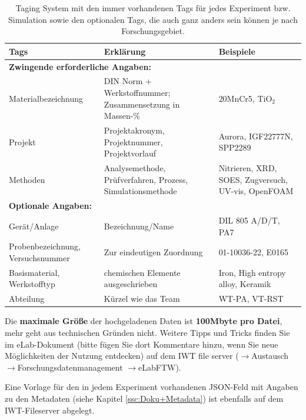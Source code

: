 \begin{table}[H]
 \centering
 \begin{tabular}{|p{5cm}|p{7cm}|p{3cm}|}
 \hline
 {\bf Tags} & {\bf Erklärung} & {\bf Beispiele} \\
 \hline
 \multicolumn{3}{|l|}{\bf Zwingende erforderliche Angaben:} \\
 \hline
 Materialbezeichnung & DIN Norm + Werkstoffnummer; Zusammensetzung in Massen-\%  & 20MnCr5, TiO$_2$ \\ \hdashline
 Projekt & Projektakronym, Projektnummer, Projektvorlauf & Aurora, IGF22777N, SPP2289 \\ \hdashline
 Methoden & Analysemethode, Prüfverfahren, Prozess, Simulationsmethode & Nitrieren, XRD, SOES, Zugversuch, UV-vis, OpenFOAM \\
 \hline
 \multicolumn{3}{|l|}{\bf Optionale Angaben:} \\
 \hline
 Gerät/Anlage & Bezeichnung/Name & DIL 805 A/D/T, PA7 \\ \hdashline
 Probenbezeichnung, Versuchsnummer & Zur eindeutigen Zuordnung & 01-10036-22, E0165 \\ \hdashline
 Basismaterial, Werkstofftyp & chemischen Elemente ausgeschrieben & Iron, High entropy alloy, Keramik \\ \hdashline
 Abteilung & Kürzel wie das Team & WT-PA, VT-RST \\
 \hline
 \end{tabular}
 \caption{Taging System mit den immer vorhandenen Tags für jedes Experiment bzw. Simulation sowie den optionalen Tags, die auch ganz anders sein können je nach Forschungsgebiet.}
\label{table:tagging-system}
\end{table}





Die \textbf{maximale Größe} der hochgeladenen Daten ist \textbf{100Mbyte pro Datei}, mehr geht aus technischen Gründen nicht. Weitere Tipps und Tricks finden Sie im eLab-Dokument (bitte fügen Sie dort Kommentare hinzu, wenn Sie neue Möglichkeiten der Nutzung entdecken) auf dem IWT file server ($\rightarrow$Austausch $\rightarrow$Forschungsdatenmanagement $\rightarrow$eLabFTW).

Eine Vorlage für den in jedem Experiment vorhandenen JSON-Feld mit Angaben zu den Metadaten (siehe Kapitel \ref{ssc:Doku+Metadata}) ist ebenfalls auf dem IWT-Fileserver abgelegt.
